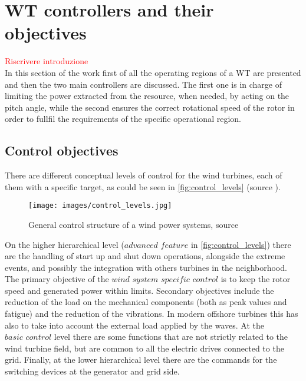 \section{WT controllers and their objectives} \label{sec:control_objective}
\textcolor{red}{Riscrivere introduzione}\\
In this section of the work first of all the operating regions of a WT are presented and then the two main controllers are discussed. The first one is in charge of limiting the power extracted from the resource, when needed, by acting on the pitch angle, while the second ensures the correct rotational speed of the rotor in order to fullfil the requirements of the specific operational region.

\subsection{Control objectives}
There are different conceptual levels of control for the wind turbines, each of them with a specific target, as could be seen in \autoref{fig:control_levels} (source \cite{9535421}).
\begin{figure}[htb]
  \centering
  \texttt{[image: images/control\_levels.jpg]}
  \caption{General control structure of a wind power systems,  source \cite{9535421}}
  \label{fig:control_levels}
\end{figure}

On the higher hierarchical level ($\textit{advanced feature}$ in \autoref{fig:control_levels}) there are the handling of start up and shut down operations, alongside the extreme events, and possibly the integration with others turbines in the neighborhood. The primary objective of the $\textit{wind system specific control}$ is to keep the rotor speed and generated power within limits. Secondary objectives include the reduction of the load on the mechanical components (both as peak values and fatigue) and the reduction of the vibrations. In modern offshore turbines this has also to take into account the external load applied by the waves. At the $\textit{basic control}$ level there are some functions that are not strictly related to the wind turbine field, but are common to all the electric drives connected to the grid. Finally, at the lower hierarchical level there are the commands for the switching devices at the generator and grid side. 


